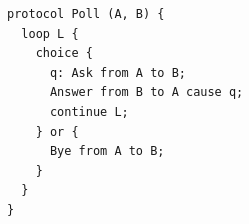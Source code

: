 \begin{lstlisting}[language={},basicstyle=\ttfamily\footnotesize,breaklines=true]
protocol Poll (A, B) {
  loop L {
    choice {
      q: Ask from A to B;
      Answer from B to A cause q;
      continue L;
    } or {
      Bye from A to B;
    }
  }
}
\end{lstlisting}
